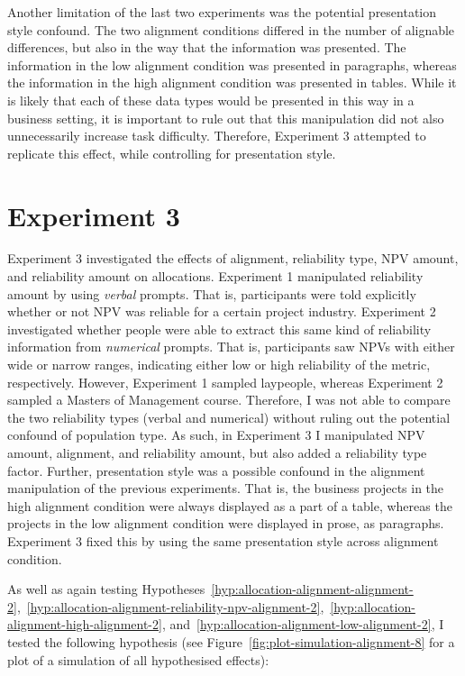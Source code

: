 \documentclass[a4paper, nobind, dvipsnames]{templates/ociamthesis}
\theoremstyle{definition}
\theoremstyle{definition}
\theoremstyle{definition}
\theoremstyle{definition}
\theoremstyle{remark}
\begin{document}
Another limitation of the last two experiments was the potential presentation
style confound. The two alignment conditions differed in the number of alignable
differences, but also in the way that the information was presented. The
information in the low alignment condition was presented in paragraphs, whereas
the information in the high alignment condition was presented in tables. While
it is likely that each of these data types would be presented in this way in a
business setting, it is important to rule out that this manipulation did not
also unnecessarily increase task difficulty. Therefore, Experiment 3 attempted
to replicate this effect, while controlling for presentation style.

\section{Experiment 3}

Experiment 3 investigated the effects of alignment, reliability type, NPV
amount, and reliability amount on allocations. Experiment 1 manipulated
reliability amount by using \emph{verbal} prompts. That is, participants were told
explicitly whether or not NPV was reliable for a certain project industry.
Experiment 2 investigated whether people were able to extract this same kind of
reliability information from \emph{numerical} prompts. That is, participants saw NPVs
with either wide or narrow ranges, indicating either low or high reliability of
the metric, respectively. However, Experiment 1 sampled laypeople, whereas
Experiment 2 sampled a Masters of Management course. Therefore, I was not able
to compare the two reliability types (verbal and numerical) without ruling out
the potential confound of population type. As such, in Experiment 3 I
manipulated NPV amount, alignment, and reliability amount, but also added a
reliability type factor. Further, presentation style was a possible confound in
the alignment manipulation of the previous experiments. That is, the business
projects in the high alignment condition were always displayed as a part of a
table, whereas the projects in the low alignment condition were displayed in
prose, as paragraphs. Experiment 3 fixed this by using the same presentation
style across alignment condition.

As well as again testing
Hypotheses~\ref{hyp:allocation-alignment-alignment-2},~\ref{hyp:allocation-alignment-reliability-npv-alignment-2},~\ref{hyp:allocation-alignment-high-alignment-2},
and~\ref{hyp:allocation-alignment-low-alignment-2}, I tested the following
hypothesis (see Figure~\ref{fig:plot-simulation-alignment-8} for a plot of a
simulation of all hypothesised effects):
\end{document}

